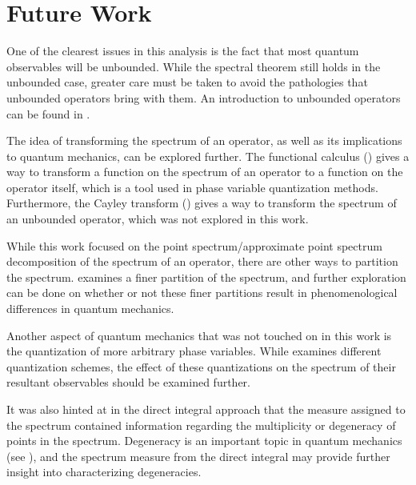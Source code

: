 \section{Future Work}
One of the clearest issues in this analysis is the fact that most quantum
observables will be unbounded. While the spectral theorem still holds in the
unbounded case, greater care must be taken to avoid the pathologies that
unbounded operators bring with them. An introduction to unbounded operators can
be found in \cite[Ch. 9]{Hall2013}.

The idea of transforming the spectrum of an operator, as well as its
implications to quantum mechanics, can be explored further. The functional
calculus (\cite[Ch. 5]{MacCluer2009}) gives a way to transform a function on the
spectrum of an operator to a function on the operator itself, which is a tool
used in phase variable quantization methods. Furthermore, the Cayley transform
(\cite[Th. 10.28]{Hall2013}) gives a way to transform the spectrum of an
unbounded operator, which was not explored in this work.

While this work focused on the point spectrum/approximate point spectrum
decomposition of the spectrum of an operator, there are other ways to partition
the spectrum. \cite{Kubrusly2008} examines a finer partition of the spectrum,
and further exploration can be done on whether or not these finer partitions
result in phenomenological differences in quantum mechanics.

Another aspect of quantum mechanics that was not touched on in this work is the
quantization of more arbitrary phase variables. While \cite[Ch. 13]{Hall2013}
examines different quantization schemes, the effect of these quantizations on
the spectrum of their resultant observables should be examined further.

It was also hinted at in the direct integral approach that the measure assigned
to the spectrum contained information regarding the multiplicity or degeneracy
of points in the spectrum. Degeneracy is an important topic in quantum
mechanics (see \cite[Ch. 6.2]{griffiths2005}), and the spectrum measure from the
direct integral may provide further insight into characterizing degeneracies.
